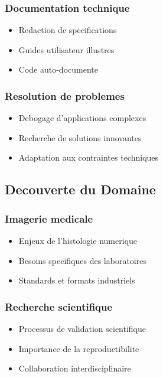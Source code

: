 \documentclass[12pt,a4paper]{article}
\begin{document}
\subsubsection{Documentation technique}
\begin{itemize}
\item Redaction de specifications
\item Guides utilisateur illustres
\item Code auto-documente
\end{itemize}

\subsubsection{Resolution de problemes}
\begin{itemize}
\item Debogage d'applications complexes
\item Recherche de solutions innovantes
\item Adaptation aux contraintes techniques
\end{itemize}

\subsection{Decouverte du Domaine}

\subsubsection{Imagerie medicale}
\begin{itemize}
\item Enjeux de l'histologie numerique
\item Besoins specifiques des laboratoires
\item Standards et formats industriels
\end{itemize}

\subsubsection{Recherche scientifique}
\begin{itemize}
\item Processus de validation scientifique
\item Importance de la reproductibilite
\item Collaboration interdisciplinaire
\end{itemize}
\end{document}
